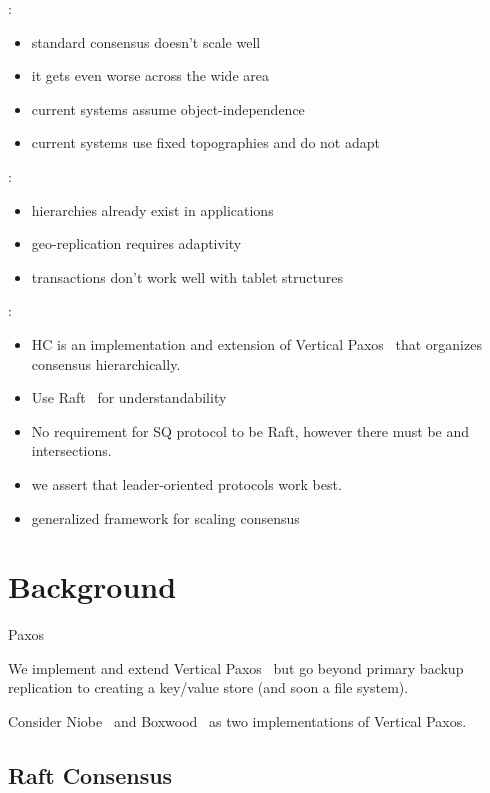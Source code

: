 \documentclass[10pt,twocolumn]{article}
\begin{document}
:

\begin{itemize}
    \item standard consensus doesn't scale well
    \item it gets even worse across the wide area
    \item current systems assume object-independence
    \item current systems use fixed topographies and do not adapt
\end{itemize}

:

\begin{itemize}
    \item hierarchies already exist in applications
    \item geo-replication requires adaptivity
    \item transactions don't work well with tablet structures
\end{itemize}

:

\begin{itemize}
    \item HC is an implementation and extension of Vertical Paxos~\cite{vertical_paxos} that organizes consensus hierarchically.
    \item Use Raft~\cite{raft} for understandability
    \item No requirement for SQ protocol to be Raft, however there must be \roo and \sub intersections.
    \item we assert that leader-oriented protocols work best.
    \item generalized framework for scaling consensus
\end{itemize}

\section*{Background}

Paxos~\cite{fast_paxos,camargos_multicoordinated_2007,lamport_generalized_2005,epaxos,spaxos}

We implement and extend Vertical Paxos~\cite{vertical_paxos} but go beyond
primary backup replication to creating a key/value store (and soon a file
system).

Consider Niobe~\cite{niobe} and Boxwood~\cite{boxwood} as two implementations
of Vertical Paxos.

\subsection*{Raft Consensus}
\end{document}
